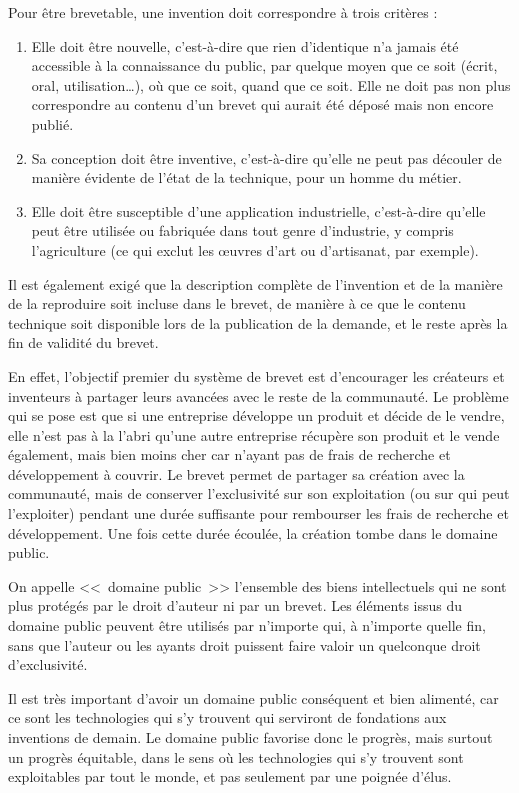 Pour être brevetable, une invention doit correspondre à trois critères :
\begin{enumerate}
\item Elle doit être nouvelle, c'est-à-dire que rien d'identique n'a jamais été accessible à la connaissance du public, par quelque moyen que ce soit (écrit, oral, utilisation\dots{}), où que ce soit, quand que ce soit. Elle ne doit pas non plus correspondre au contenu d'un brevet qui aurait été déposé mais non encore publié.
\item Sa conception doit être inventive, c'est-à-dire qu'elle ne peut pas découler de manière évidente de l'état de la technique, pour un homme du métier.
\item Elle doit être susceptible d'une application industrielle, c'est-à-dire qu'elle peut être utilisée ou fabriquée dans tout genre d'industrie, y compris l'agriculture (ce qui exclut les œuvres d'art ou d'artisanat, par exemple).
\end{enumerate}\bigskip

Il est également exigé que la description complète de l'invention et de la manière de la reproduire soit incluse dans le brevet, de manière à ce que le contenu technique soit disponible lors de la publication de la demande, et le reste après la fin de validité du brevet.

En effet, l'objectif premier du système de brevet est d'encourager les créateurs et inventeurs à partager leurs avancées avec le reste de la communauté.
Le problème qui se pose est que si une entreprise développe un produit et décide de le vendre, elle n'est pas à la l'abri qu'une autre entreprise récupère son produit et le vende également, mais bien moins cher car n'ayant pas de frais de recherche et développement à couvrir.
Le brevet permet de partager sa création avec la communauté, mais de conserver l'exclusivité sur son exploitation (ou sur qui peut l'exploiter) pendant une durée suffisante pour rembourser les frais de recherche et développement.
Une fois cette durée écoulée, la création tombe dans le domaine public.

On appelle <<~domaine public~>> l'ensemble des biens intellectuels qui ne sont plus protégés par le droit d'auteur ni par un brevet.
Les éléments issus du domaine public peuvent être utilisés par n'importe qui, à n'importe quelle fin, sans que l'auteur ou les ayants droit puissent faire valoir un quelconque droit d'exclusivité.

Il est très important d'avoir un domaine public conséquent et bien alimenté, car ce sont les technologies qui s'y trouvent qui serviront de fondations aux inventions de demain.
Le domaine public favorise donc le progrès, mais surtout un progrès équitable, dans le sens où les technologies qui s'y trouvent sont exploitables par tout le monde, et pas seulement par une poignée d'élus.

